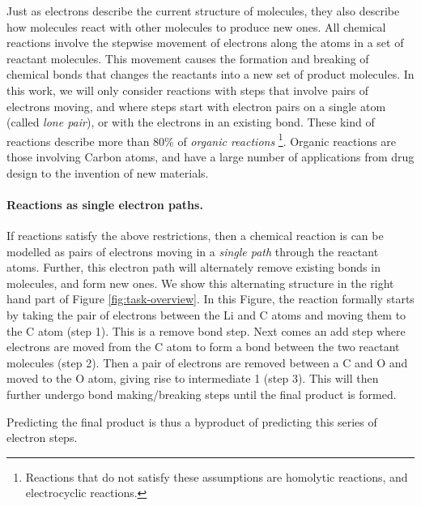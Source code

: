 Just as electrons describe the current structure of molecules, 
they also describe how molecules react with other molecules to produce new ones. 
All chemical reactions involve the stepwise movement of electrons along the atoms in a set of reactant molecules. 
This movement causes the formation and breaking of chemical bonds that changes the reactants into a new set of product molecules.\cite{herges1994coarctate} 
In this work, we will only consider reactions with steps that involve pairs of electrons moving, and
where steps start with electron pairs on a single atom (called \emph{lone pair}), or with the electrons in an existing bond. 
These kind of reactions describe more than 80\% of \emph{organic reactions}\cite{herges1994coarctate} \footnote{Reactions that do not satisfy these assumptions are homolytic reactions, and electrocyclic reactions.}. 
Organic reactions are those involving Carbon atoms, and have a large number of applications from drug design to the invention of new materials\cite{segler2018planning}.


\paragraph{Reactions as single electron paths.}
If reactions satisfy the above restrictions, then a chemical reaction is can be modelled as pairs of electrons moving in a \emph{single path} through the reactant atoms. 
Further, this electron path will alternately remove existing bonds in molecules, and form new ones. We show this alternating structure in the right hand part of Figure \ref{fig:task-overview}. 
In this Figure, the reaction formally starts by taking the pair of electrons between the Li and C atoms and moving them to the C atom (step 1). This is a remove bond step. 
Next comes an add step where electrons are moved from the C atom to form a bond between the two reactant molecules (step 2).
Then a pair of electrons are removed between a C and O and moved to the O atom, giving rise to intermediate 1 (step 3). This will then further undergo bond making/breaking steps until the final product is formed.

Predicting the final product is thus a byproduct of predicting this series of electron steps.

